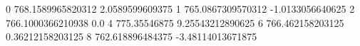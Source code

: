 0 768.1589965820312 2.0589599609375
1 765.0867309570312 -1.0133056640625
2 766.1000366210938 0.0
4 775.35546875 9.25543212890625
6 766.462158203125 0.36212158203125
8 762.618896484375 -3.48114013671875
